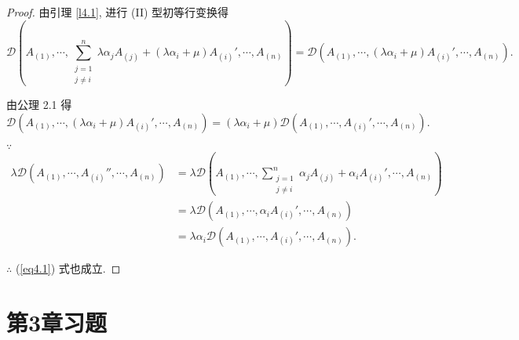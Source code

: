 \documentclass{ctexart}
\begin{document}
\begin{proof}
    由引理 \ref{l4.1}, 进行 (II) 型初等行变换得
    \[\mathcal{D}\left(A_{(1)},\cdots,\sum\limits_{\substack{j=1\\j\neq i}}^{n}\lambda\alpha_jA_{(j)}+(\lambda\alpha_i+\mu)A_{(i)}',\cdots,A_{(n)}\right)=\mathcal{D}\left(A_{(1)},\cdots,(\lambda\alpha_i+\mu)A_{(i)}',\cdots,A_{(n)}\right).\]

    由公理 2.1 得
    \[\mathcal{D}\left(A_{(1)},\cdots,(\lambda\alpha_i+\mu)A_{(i)}',\cdots,A_{(n)}\right)=(\lambda\alpha_i+\mu)\mathcal{D}\left(A_{(1)},\cdots,A_{(i)}',\cdots,A_{(n)}\right).\]

    $\because$
    \begin{align*}
        \lambda\mathcal{D}(A_{(1)},\cdots,A_{(i)}'',\cdots,A_{(n)}) & =\lambda\mathcal{D}\left(A_{(1)},\cdots,\sum\limits_{\substack{j=1\\j\neq i}}^{n}\alpha_jA_{(j)}+\alpha_iA_{(i)}',\cdots,A_{(n)}\right) \\
        & =\lambda\mathcal{D}\left(A_{(1)},\cdots,\alpha_iA_{(i)}',\cdots,A_{(n)}\right) \\
        & =\lambda\alpha_i\mathcal{D}\left(A_{(1)},\cdots,A_{(i)}',\cdots,A_{(n)}\right).
    \end{align*}

    $\therefore$ (\ref{eq4.1}) 式也成立.
\end{proof}
\section{第3章习题}
\end{document}
